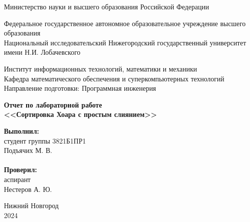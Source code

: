 \documentclass{report}
\begin{document}
\begin{titlepage}

\begin{center}
Министерство науки и высшего образования Российской Федерации
\end{center}

\begin{center}
Федеральное государственное автономное образовательное учреждение высшего образования \\
Национальный исследовательский Нижегородский государственный университет имени Н.И. Лобачевского
\end{center}

\begin{center}
Институт информационных технологий, математики и механики \\
Кафедра математического обеспечения и суперкомпьютерных технологий \\
Направление подготовки: Программная инженерия
\end{center}

\vspace{4em}

\begin{center}
\textbf{\Large Отчет по лабораторной работе \\
\vspace{0.5em}
<<Сортировка Хоара с простым слиянием>>} \\
\end{center}

\vspace{4em}

\hfill\parbox{7cm}{
\hspace*{5cm}\hspace*{-5cm}\textbf{Выполнил:} \\ студент группы 3821Б1ПР1\\
Подъячих М. В.\\
\\
\hspace*{5cm}\hspace*{-5cm}\textbf{Проверил:}\\ аспирант\\Нестеров А. Ю.\\
}

\vspace{\fill}

\begin{center} Нижний Новгород \\ 2024 \end{center}

\end{titlepage}
\end{document}
